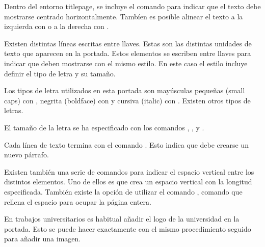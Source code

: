 \documentclass[11pt, a4paper]{article}
\begin{document}







Dentro del entorno titlepage, se incluye el comando  para indicar que el texto debe mostrarse centrado horizontalmente. Tambíen es posible alinear el texto a la izquierda con  o a la derecha con .

Existen distintas líneas escritas entre llaves. Estas son las distintas unidades de texto que aparecen en la portada. Estos elementos se escriben entre llaves para indicar que deben mostrarse con el mismo estilo. En este caso el estilo incluye definir el tipo de letra y su tamaño.

Los tipos de letra utilizados en esta portada son mayúsculas pequeñas (small caps) con , negrita (boldface) con  y cursiva (italic) con . Existen otros tipos de letras.

El tamaño de la letra se ha especificado con los comandos , ,  y . 

Cada línea de texto termina con el comando . Esto indica que debe crearse un nuevo párrafo. 

Existen también una serie de comandos para indicar el espacio vertical entre los distintos elementos. Uno de ellos es  que crea un espacio vertical con la longitud especificada. También existe la opción de utilizar el comando , comando que rellena el espacio para ocupar la página entera.

En trabajos universitarios es habitual añadir el logo de la universidad en la portada. Esto se puede hacer exactamente con el mismo procedimiento seguido para añadir una imagen.






\end{document}
